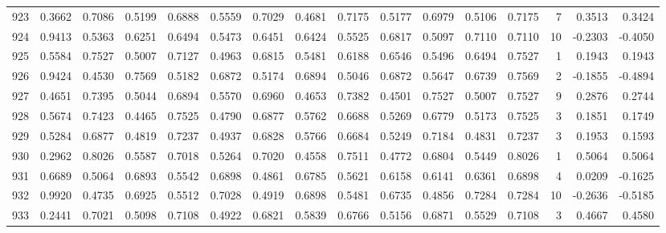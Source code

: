 \begin{tabular}{lrrrrrrrrrrrrrrr}
923 &      0.3662 &  0.7086 &  0.5199 &  0.6888 &  0.5559 &  0.7029 &  0.4681 &  0.7175 &  0.5177 &  0.6979 &   0.5106 &     0.7175 &      7 &                    0.3513 &                     0.3424 \\
924 &      0.9413 &  0.5363 &  0.6251 &  0.6494 &  0.5473 &  0.6451 &  0.6424 &  0.5525 &  0.6817 &  0.5097 &   0.7110 &     0.7110 &     10 &                   -0.2303 &                    -0.4050 \\
925 &      0.5584 &  0.7527 &  0.5007 &  0.7127 &  0.4963 &  0.6815 &  0.5481 &  0.6188 &  0.6546 &  0.5496 &   0.6494 &     0.7527 &      1 &                    0.1943 &                     0.1943 \\
926 &      0.9424 &  0.4530 &  0.7569 &  0.5182 &  0.6872 &  0.5174 &  0.6894 &  0.5046 &  0.6872 &  0.5647 &   0.6739 &     0.7569 &      2 &                   -0.1855 &                    -0.4894 \\
927 &      0.4651 &  0.7395 &  0.5044 &  0.6894 &  0.5570 &  0.6960 &  0.4653 &  0.7382 &  0.4501 &  0.7527 &   0.5007 &     0.7527 &      9 &                    0.2876 &                     0.2744 \\
928 &      0.5674 &  0.7423 &  0.4465 &  0.7525 &  0.4790 &  0.6877 &  0.5762 &  0.6688 &  0.5269 &  0.6779 &   0.5173 &     0.7525 &      3 &                    0.1851 &                     0.1749 \\
929 &      0.5284 &  0.6877 &  0.4819 &  0.7237 &  0.4937 &  0.6828 &  0.5766 &  0.6684 &  0.5249 &  0.7184 &   0.4831 &     0.7237 &      3 &                    0.1953 &                     0.1593 \\
930 &      0.2962 &  0.8026 &  0.5587 &  0.7018 &  0.5264 &  0.7020 &  0.4558 &  0.7511 &  0.4772 &  0.6804 &   0.5449 &     0.8026 &      1 &                    0.5064 &                     0.5064 \\
931 &      0.6689 &  0.5064 &  0.6893 &  0.5542 &  0.6898 &  0.4861 &  0.6785 &  0.5621 &  0.6158 &  0.6141 &   0.6361 &     0.6898 &      4 &                    0.0209 &                    -0.1625 \\
932 &      0.9920 &  0.4735 &  0.6925 &  0.5512 &  0.7028 &  0.4919 &  0.6898 &  0.5481 &  0.6735 &  0.4856 &   0.7284 &     0.7284 &     10 &                   -0.2636 &                    -0.5185 \\
933 &      0.2441 &  0.7021 &  0.5098 &  0.7108 &  0.4922 &  0.6821 &  0.5839 &  0.6766 &  0.5156 &  0.6871 &   0.5529 &     0.7108 &      3 &                    0.4667 &                     0.4580 \\

\end{tabular}
